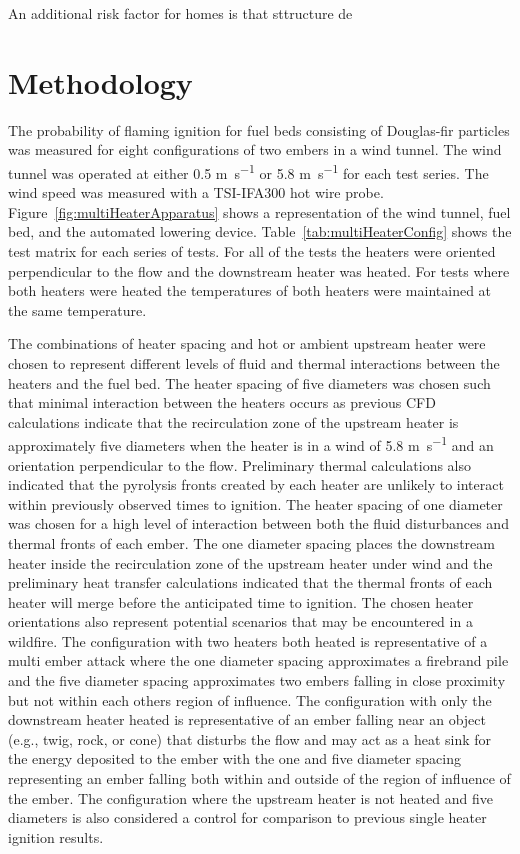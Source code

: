     An additional risk factor for homes is that sttructure de
\section{Methodology}
    The probability of flaming ignition for fuel beds consisting of Douglas-fir particles was measured for eight configurations of two embers in a wind tunnel. The wind tunnel was operated at either 0.5 \si{\meter\per\second} or 5.8 \si{\meter\per\second} for each test series. The wind speed was measured with a TSI-IFA300 hot wire probe. Figure~\ref{fig:multiHeaterApparatus} shows a representation of the wind tunnel, fuel bed, and the automated lowering device. Table~\ref{tab:multiHeaterConfig} shows the test matrix for each series of tests. For all of the tests the heaters were oriented perpendicular to the flow and the downstream heater was heated. For tests where both heaters were heated the temperatures of both heaters were maintained at the same temperature. 
    
    The combinations of heater spacing and hot or ambient upstream heater were chosen to represent different levels of fluid and thermal interactions between the heaters and the fuel bed. The heater spacing of five diameters was chosen such that minimal interaction between the heaters occurs as previous CFD calculations indicate that the recirculation zone of the upstream heater is approximately five diameters when the heater is in a wind of 5.8 \si{\meter\per\second} and an orientation perpendicular to the flow. Preliminary thermal calculations also indicated that the pyrolysis fronts created by each heater are unlikely to interact within previously observed times to ignition. The heater spacing of one diameter was chosen for a high level of interaction between both the fluid disturbances and thermal fronts of each ember. The one diameter spacing places the downstream heater inside the recirculation zone of the upstream heater under wind and the preliminary heat transfer calculations indicated that the thermal fronts of each heater will merge before the anticipated time to ignition. The chosen heater orientations also represent potential scenarios that may be encountered in a wildfire. The configuration with two heaters both heated is representative of a multi ember attack where the one diameter spacing approximates a firebrand pile and the five diameter spacing approximates two embers falling in close proximity but not within each others region of influence. The configuration with only the downstream heater heated is representative of an ember falling near an object (e.g., twig, rock, or cone) that disturbs the flow and may act as a heat sink for the energy deposited to the ember with the one and five diameter spacing representing an ember falling both within and outside of the region of influence of the ember. The configuration where the upstream heater is not heated and five diameters is also considered a control for comparison to previous single heater ignition results.
    
